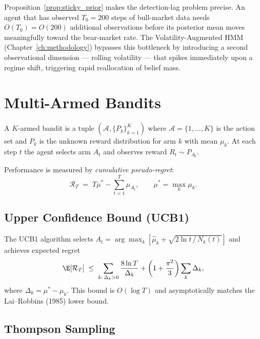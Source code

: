 \begin{remark}
Proposition~\ref{prop:sticky_prior} makes the detection-lag problem precise.
An agent that has observed $T_0 = 200$ steps of bull-market data needs
$O(T_0) = O(200)$ additional observations before its posterior mean moves
meaningfully toward the bear-market rate.  The Volatility-Augmented HMM
(Chapter~\ref{ch:methodology}) bypasses this bottleneck by introducing a
second observational dimension --- rolling volatility --- that spikes
immediately upon a regime shift, triggering rapid reallocation of belief mass.
\end{remark}

\section{Multi-Armed Bandits}

\begin{definition}
A $K$-armed bandit is a tuple $(\mathcal{A}, \{P_k\}_{k=1}^K)$ where
$\mathcal{A} = \{1,\ldots,K\}$ is the action set and $P_k$ is the unknown
reward distribution for arm $k$ with mean $\mu_k$.  At each step $t$ the
agent selects arm $A_t$ and observes reward $R_t \sim P_{A_t}$.
\end{definition}

Performance is measured by \emph{cumulative pseudo-regret}:
\[
    \mathcal{R}_T \;=\; T\mu^* - \sum_{t=1}^T \mu_{A_t},
    \qquad \mu^* = \max_k \mu_k.
\]

\subsection{Upper Confidence Bound (UCB1)}

\begin{theorem}
\label{thm:ucb_regret}
The UCB1 algorithm selects $A_t = \arg\max_k
\left[\hat\mu_k + \sqrt{2\ln t\,/\,N_k(t)}\right]$
and achieves expected regret
\[
    \E[\mathcal{R}_T] \;\leq\; \sum_{k:\,\Delta_k > 0}
    \frac{8\ln T}{\Delta_k} + \left(1 + \frac{\pi^2}{3}\right)\sum_k \Delta_k,
\]
where $\Delta_k = \mu^* - \mu_k$.  This bound is $O(\log T)$ and
asymptotically matches the Lai--Robbins (1985) lower bound.
\end{theorem}

\subsection{Thompson Sampling}

